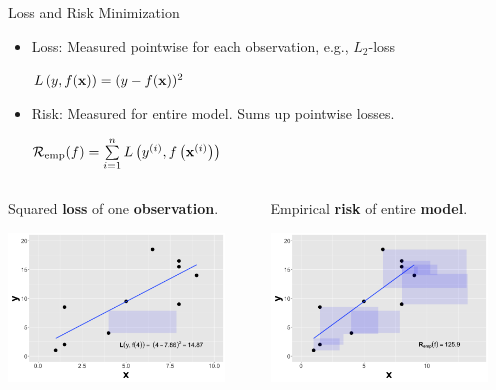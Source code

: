 \documentclass[11pt,compress,t,notes=noshow, xcolor=table]{beamer}
\begin{document}
\begin{vbframe}{Loss and Risk Minimization}

\begin{itemize}
\item Loss: Measured pointwise for each observation, e.g., $L_2$-loss 
\begin{center}
$L\left(y, f(\mathbf{x})\right) = (y - f(\mathbf{x}))^2$
\end{center}
\item Risk: Measured for entire model. Sums up pointwise losses.
\begin{center}
$ \mathcal{R}_{\text{emp}}(f) = \sum\limits_{i=1}^n L\left(y^{(i)}, f\left(\mathbf{x}^{(i)}\right)\right) $
\end{center} 
\hspace{1cm}
\end{itemize}
\begin{columns}  
\begin{column}{0.5\textwidth} 
\small Squared \textbf{loss} of one \textbf{observation}.
  \begin{center}
    \includegraphics[width=0.9\textwidth]{slides/ml-basics/figure/nutshell-ml-basics-loss-regression.png} 
  \end{center}
\end{column}  
\begin{column}{0.5\textwidth} 
\small Empirical \textbf{risk} of entire \textbf{model}.

  \begin{center}
    \includegraphics[width=0.9\textwidth]{slides/ml-basics/figure/nutshell-ml-basics-empirical-risk-regression.png} 
  \end{center}
\end{column} 
\end{columns}
\end{vbframe}
\end{document}
